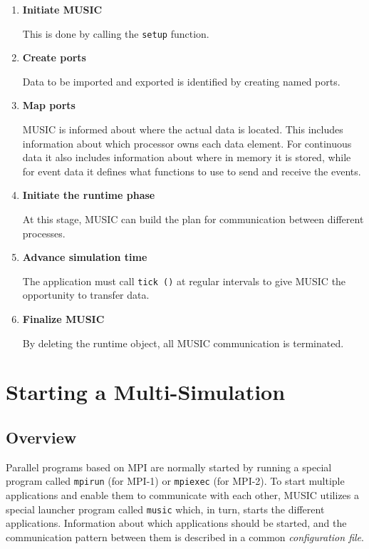 \documentclass[a4paper]{report}
\begin{document}
\begin{enumerate}
\item \textbf{Initiate MUSIC}

  This is done by calling the \lstinline!setup! function.
\item \textbf{Create ports}

  Data to be imported and exported is identified by creating named
  ports.
\item \textbf{Map ports}

  MUSIC is informed about where the actual data is located.
  This includes information about which processor owns each data
  element.  For continuous data it also includes information about
  where in memory it is stored, while for event data it defines what
  functions to use to send and receive the events.
\item \textbf{Initiate the runtime phase}

  At this stage, MUSIC can build the plan for communication between
  different processes.
\item \textbf{Advance simulation time}

  The application must call \lstinline!tick ()! at regular intervals
  to give MUSIC the opportunity to transfer data.
\item \textbf{Finalize MUSIC}

  By deleting the runtime object, all MUSIC communication is terminated.
\end{enumerate}


\chapter{Starting a Multi-Simulation}

\section{Overview}

Parallel programs based on MPI are normally started by running a
special program called \texttt{mpirun} (for MPI-1) or
\texttt{mpiexec} (for MPI-2).  To start multiple
applications and enable them to communicate with each other, MUSIC
utilizes a special launcher program called \texttt{music}
which, in turn, starts the different applications.  Information about
which applications should be started, and the communication pattern
between them is described in a common \emph{configuration
  file}.
\end{document}
